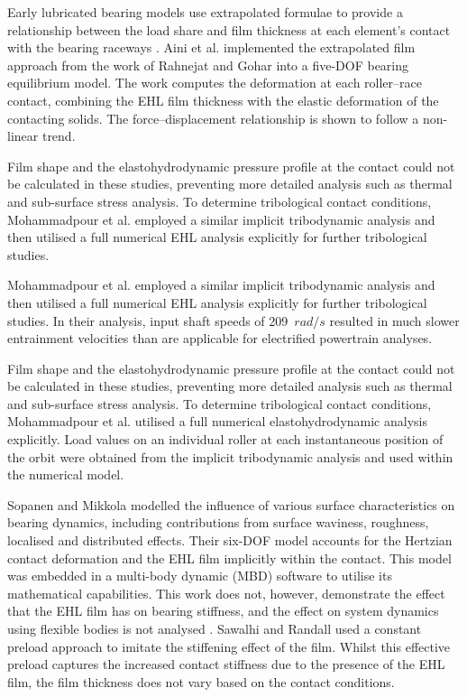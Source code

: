 Early lubricated bearing models use extrapolated formulae to provide a relationship between the load share and film thickness at each element’s contact with the bearing raceways \cite{Rahnejat1985}. Aini et al. \cite{Aini2002} implemented the extrapolated film approach from the work of Rahnejat and Gohar \cite{Rahnejat1985} into a five-DOF bearing equilibrium model. The work computes the deformation at each roller–race contact, combining the EHL film thickness with the elastic deformation of the contacting solids. The force–displacement relationship is shown to follow a non-linear trend.

Film shape and the elastohydrodynamic pressure profile at the contact could not be calculated in these studies, preventing more detailed analysis such as thermal and sub-surface stress analysis. To determine tribological contact conditions, Mohammadpour et al. \cite{Mohammadpour2015c} employed a similar implicit tribodynamic analysis and then utilised a full numerical EHL analysis explicitly for further tribological studies.

Mohammadpour et al. \cite{Mohammadpour2015c} employed a similar implicit tribodynamic analysis and then utilised a full numerical EHL analysis explicitly for further tribological studies. In their analysis, input shaft speeds of 209~$rad/s$ resulted in much slower entrainment velocities than are applicable for electrified powertrain analyses. 

Film shape and the elastohydrodynamic pressure profile at the contact could not be calculated in these studies, preventing more detailed analysis such as thermal and sub-surface stress analysis. To determine tribological contact conditions, Mohammadpour et al. \cite{Mohammadpour2015c} utilised a full numerical elastohydrodynamic analysis explicitly. Load values on an individual roller at each instantaneous position of the orbit were obtained from the implicit tribodynamic analysis and used within the numerical model.

Sopanen and Mikkola \cite{Sopanen2003_1} modelled the influence of various surface characteristics on bearing dynamics, including contributions from surface waviness, roughness, localised and distributed effects. Their six-DOF model accounts for the Hertzian contact deformation and the EHL film implicitly within the contact. This model was embedded in a multi-body dynamic (MBD) software to utilise its mathematical capabilities. This work does not, however, demonstrate the effect that the EHL film has on bearing stiffness, and the effect on system dynamics using flexible bodies is not analysed \cite{Sopanen2003_2}. Sawalhi and Randall \cite{Sawalhi2008} used a constant preload approach to imitate the stiffening effect of the film. Whilst this effective preload captures the increased contact stiffness due to the presence of the EHL film, the film thickness does not vary based on the contact conditions.

